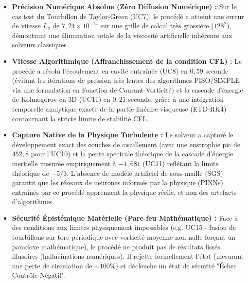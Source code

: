 \documentclass[11pt,a4paper]{article}
\begin{document}
\begin{itemize}
    \item \textbf{Précision Numérique Absolue (Zéro Diffusion Numérique) :} Sur le cas test du Tourbillon de Taylor-Green (UC7), le procédé a atteint une erreur de vitesse $L_2$ de $7,24 \times 10^{-14}$ sur une grille de calcul très grossière ($128^2$), démontrant une élimination totale de la viscosité artificielle inhérente aux solveurs classiques.
    \item \textbf{Vitesse Algorithmique (Affranchissement de la condition CFL) :} Le procédé a résolu l'écoulement en cavité entraînée (UC8) en $0,59$ seconde (évitant les itérations de pression très lentes des algorithmes PISO/SIMPLE via une formulation en Fonction de Courant-Vorticité) et la cascade d'énergie de Kolmogorov en 3D (UC11) en $0,21$ seconde, grâce à une intégration temporelle analytique exacte de la partie linéaire visqueuse (ETD-RK4) contournant la stricte limite de stabilité CFL.
    \item \textbf{Capture Native de la Physique Turbulente :} Le solveur a capturé le développement exact des couches de cisaillement (avec une enstrophie pic de $452,8$ pour l'UC10) et la pente spectrale théorique de la cascade d'énergie inertielle mesurée empiriquement à $-1,681$ (UC11) reflétant la limite théorique de $-5/3$. L'absence de modèle artificiel de sous-maille (SGS) garantit que les réseaux de neurones informés par la physique (PINNs) entraînés par ce procédé apprennent la physique réelle, et non des artefacts d'algorithmes.
    \item \textbf{Sécurité Épistémique Matérielle (Pare-feu Mathématique) :} Face à des conditions aux limites physiquement impossibles (e.g. UC15 - fusion de tourbillons sur tore périodique avec vorticité moyenne non nulle forçant un paradoxe mathématique), le procédé ne produit pas de résultats lissés illusoires (hallucinations numériques). Il rejette formellement l'état (mesurant une perte de circulation de $\sim 100\%$) et déclenche un état de sécurité "Échec Contrôle Négatif".
\end{itemize}
\end{document}
